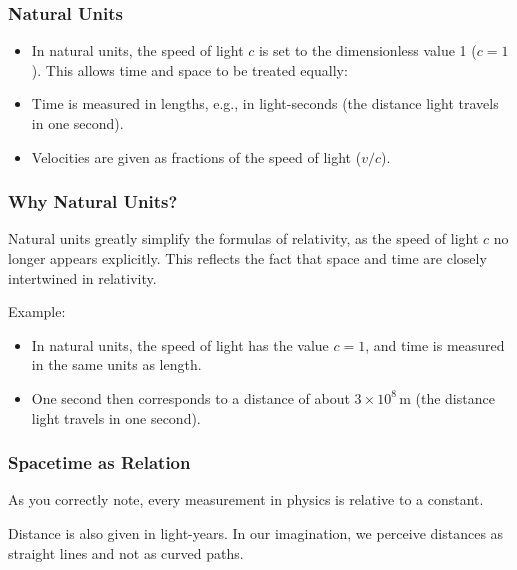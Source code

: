 \documentclass[a4paper,12pt]{article}
\begin{document}
	\subsubsection{Natural Units}
	\begin{itemize}
		\item In natural units, the speed of light \( c \) is set to the dimensionless value 1 (\( c = 1 \)). This allows time and space to be treated equally:
		\item Time is measured in lengths, e.g., in light-seconds (the distance light travels in one second).
		\item Velocities are given as fractions of the speed of light (\( v/c \)).
	\end{itemize}
	
	\subsubsection{Why Natural Units?}
	Natural units greatly simplify the formulas of relativity, as the speed of light \( c \) no longer appears explicitly. This reflects the fact that space and time are closely intertwined in relativity.
	
	Example:
	\begin{itemize}
		\item In natural units, the speed of light has the value \( c = 1 \), and time is measured in the same units as length.
		\item One second then corresponds to a distance of about \( 3 \times 10^8 \, \text{m} \) (the distance light travels in one second).
	\end{itemize}
	
	\subsubsection{Spacetime as Relation}
	As you correctly note, every measurement in physics is relative to a constant.
	
	Distance is also given in light-years. In our imagination, we perceive distances as straight lines and not as curved paths.
	
\end{document}
